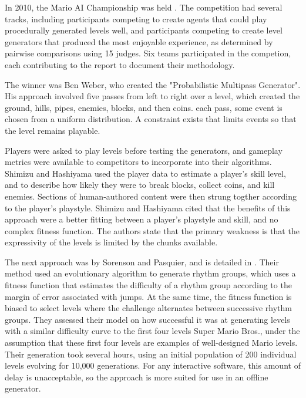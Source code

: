 In 2010, the Mario AI Championship was held \cite{shaker2011}. The competition had several
tracks, including participants competing to create agents that could play procedurally
generated levels well, and participants competing to create level generators that produced
the most enjoyable experience, as determined by pairwise comparisons using 15 judges.
Six teams participated in the competion, each contributing to the report to document their
methodology.

The winner was Ben Weber, who created the "Probabilistic Multipass Generator". His approach
involved five passes from left to right over a level, which created the ground, hills, 
pipes, enemies, blocks, and then coins. each pass, some event is chosen from a uniform
distribution. A constraint exists that limits events so that the level remains playable.

Players were asked to play levels before testing the generators, and gameplay metrics were
available to competitors to incorporate into their algorithms. Shimizu and Hashiyama used
the player data to estimate a player's skill level, and to describe how likely they were to
break blocks, collect coins, and kill enemies. Sections of human-authored content were then
strung togther according to the player's playstyle. Shimizu and Hashiyama cited that the
benefits of this approach were a better fitting between a player's playstyle and skill, and
no complex fitness function. The authors state that the primary weakness is that the
expressivity of the levels is limited by the chunks available.

The next approach was by Sorenson and Pasquier, and is detailed in \cite{sorenson2010}.
Their method used an evolutionary algorithm to generate rhythm groups, which uses a fitness
function that estimates the difficulty of a rhythm group according to the margin of error
associated with jumps. At the same time, the fitness function is biased to select levels 
where the challenge alternates between successive rhythm groups. They assessed their model
on how successful it was at generating levels with a similar difficulty curve to the first
four levels Super Mario Bros., under the assumption that these first four levels are 
examples of well-designed Mario levels. Their generation took several hours, using an 
initial population of 200 individual levels evolving for 10,000 generations. For any
interactive software, this amount of delay is unacceptable, so the approach is more suited
for use in an offline generator.

